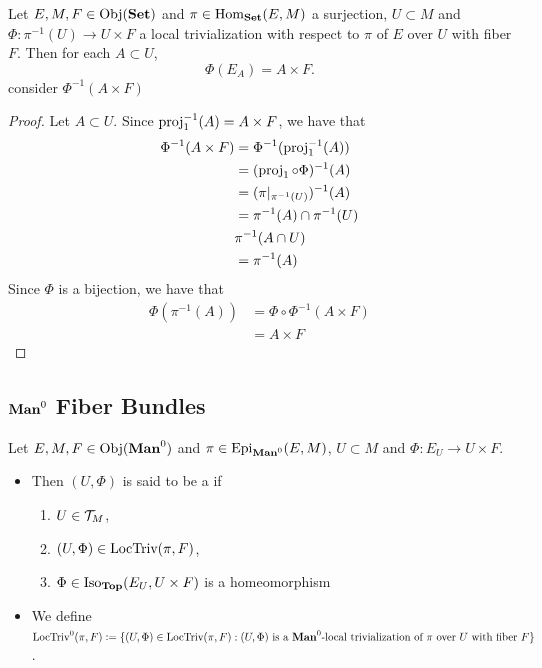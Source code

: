 \documentclass{book}
\begin{document}
	\begin{ex} 
		Let $E, M, F \in \operatorname{Obj}(\text{\textbf{Set}})$ and $\pi \in \operatorname{Hom}_{\text{\textbf{Set}}}(E, M)$ a surjection, $U \subset M$ and $\Phi: \pi^{-1}(U) \rightarrow U \times F$ a local trivialization with respect to $\pi$ of $E$ over $U$ with fiber $F$. Then for each $A \subset U$, 
		$$\Phi(E_A) = A \times F.$$
		 consider $\Phi^{-1}(A \times F)$ 
	\end{ex}
	
	\begin{proof}
		Let $A \subset U$. Since $\operatorname{\text{proj}}_1^{-1}(A) = A \times F$, we have that 
		\begin{align*}
			\Phi^{-1}(A \times F)
			& = \Phi^{-1}(\operatorname{\text{proj}}_1^{-1}(A)) \\
			& = (\operatorname{\text{proj}}_1 \circ \Phi)^{-1}(A) \\
			& = (\pi|_{\pi^{-1}(U)})^{-1}(A) \\
			& = \pi^{-1}(A) \cap \pi^{-1}(U) \\
			&  \pi^{-1}(A \cap U) \\
			& = \pi^{-1}(A)
		\end{align*}
		Since $\Phi$ is a bijection, we have that
		\begin{align*}
			\Phi (\pi^{-1}(A))
			& = \Phi \circ \Phi^{-1}(A \times F) \\
			& = A \times F
		\end{align*}
	\end{proof}














	
	\subsection{$\operatorname*{\text{\textbf{Man}}^0}$ Fiber Bundles}
	
	\begin{defn} 
		Let $E, M, F \in \operatorname{Obj}(\operatorname*{\text{\textbf{Man}}^0})$ and $\pi \in \operatorname{Epi}_{\operatorname*{\text{\textbf{Man}}^0}}(E, M)$, $U \subset M$ and $\Phi: E_U \rightarrow U \times F$. 
		\begin{itemize}
			\item Then $(U, \Phi)$ is said to be a   if 
			\begin{enumerate}
				\item $U \in \mathcal{T}_M$,
				\item $(U, \Phi) \in \text{LocTriv}(\pi, F)$,
				\item $\Phi \in \operatorname{Iso}_{\operatorname*{\text{\textbf{Top}}}}(E_U, U \times F)$ is a homeomorphism
			\end{enumerate}
			\item We define $\text{LocTriv}^0(\pi, F) \vcentcolon= \{(U, \Phi) \in \text{LocTriv}(\pi, F): \text{$(U, \Phi)$ is a $\operatorname*{\text{\textbf{Man}}^0}$-local trivialization of $\pi$ over $U$ with fiber $F$}\}$.
		\end{itemize}
	\end{defn}
 
\end{document}
